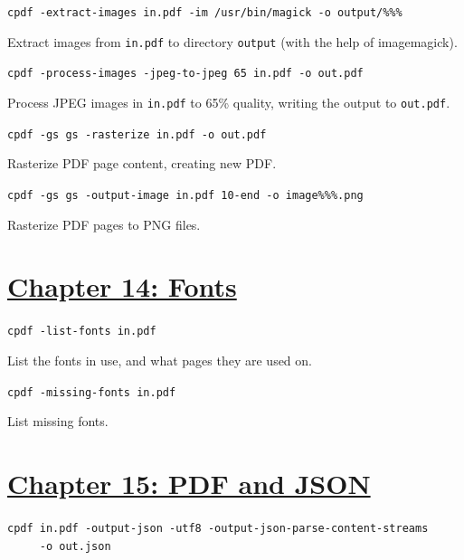 \documentclass{book}
\begin{document}
\begin{framed}\noindent\texttt{cpdf -extract-images in.pdf -im /usr/bin/magick -o output/\%\%\%}\end{framed}

\noindent Extract images from \texttt{in.pdf} to directory \texttt{output} (with the help of imagemagick).

\begin{framed}\noindent\texttt{cpdf -process-images -jpeg-to-jpeg 65 in.pdf -o out.pdf}\end{framed}

\noindent Process JPEG images in \texttt{in.pdf} to 65\% quality, writing the output to \texttt{out.pdf}.

\begin{framed}\noindent\texttt{cpdf -gs gs -rasterize in.pdf -o out.pdf}\end{framed}

\noindent Rasterize PDF page content, creating new PDF.

\begin{framed}\noindent\texttt{cpdf -gs gs -output-image in.pdf 10-end -o image\%\%\%.png}\end{framed}

\noindent Rasterize PDF pages to PNG files.

\section*{\hyperref[chap:14]{Chapter 14: Fonts}}

\begin{framed}\noindent\texttt{cpdf -list-fonts in.pdf}\end{framed}

\noindent List the fonts in use, and what pages they are used on.

\begin{framed}\noindent\texttt{cpdf -missing-fonts in.pdf}\end{framed}

\noindent List missing fonts.

\section*{\hyperref[chap:15]{Chapter 15: PDF and JSON}}

\begin{framed}
 \noindent\small\verb?cpdf in.pdf -output-json -utf8 -output-json-parse-content-streams?\\
 \noindent\small\verb?     -o out.json?
\end{framed}
\end{document}
